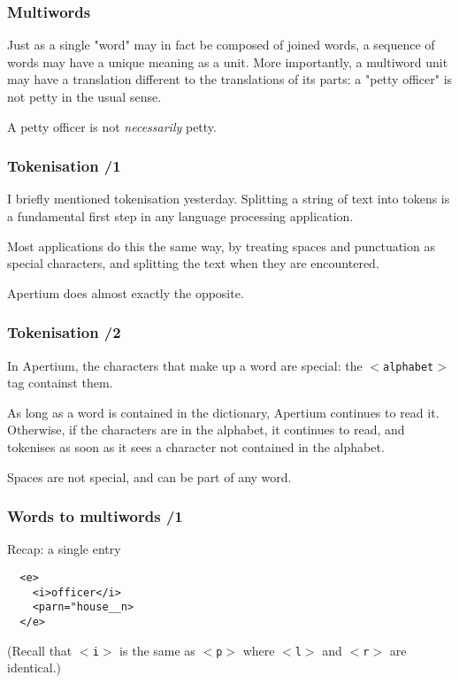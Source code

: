 \documentclass{beamer} %
\begin{document}
\begin{frame}
  \frametitle{Multiwords}
  Just as a single "word" may in fact be composed of joined words, 
  a sequence of words may have a unique meaning as a unit.
  More importantly, a multiword unit may have a translation different
  to the translations of its parts: a "petty officer" is not petty in
  the usual sense.

  \pause

  A petty officer is not {\it necessarily} petty.

\end{frame}
\begin{frame}
  \frametitle{Tokenisation /1}
  I briefly mentioned tokenisation yesterday. Splitting a string of text into tokens
  is a fundamental first step in any language processing application.

  Most applications do this the same way, by treating spaces and punctuation as
  special characters, and splitting the text when they are encountered.

  \pause

   Apertium does almost exactly the opposite.
\end{frame}
\begin{frame}
  \frametitle{Tokenisation /2}
  In Apertium, the characters that make up a word are special: the 
  {\tt $<$alphabet$>$} tag containst them.

  As long as a word is contained in the dictionary, Apertium continues to 
  read it. Otherwise, if the characters are in the alphabet, it continues
  to read, and tokenises as soon as it sees a character not contained in
  the alphabet.

  \pause

  Spaces are not special, and can be part of any word.
\end{frame}
\begin{frame}
  \frametitle{Words to multiwords /1}

  \begin{exampleblock}{Recap: a single entry}
    \begin{footnotesize}
    \begin{alltt}
      ~~<e> \\
      ~~~~<i>officer</i> \\
      ~~~~<par n="house\_\_n> \\
      ~~</e> \\
    \end{alltt}
    \end{footnotesize}
  \end{exampleblock}

  (Recall that {\tt $<$i$>$} is the same as {\tt $<$p$>$}
  where {\tt $<$l$>$} and {\tt $<$r$>$} are identical.)
\end{frame}
\end{document}
